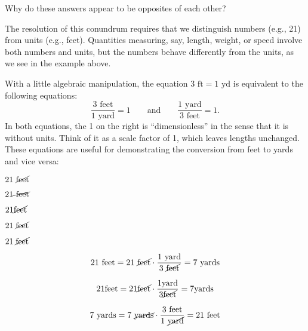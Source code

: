 \documentclass[nooutcomes]{ximera}
\begin{document}
Why do these answers appear to be opposites of each other?  

The resolution of this conundrum requires that we distinguish numbers (e.g., 21) from units (e.g., feet).  Quantities measuring, say, length, weight, or speed involve both numbers and units, but the numbers behave differently from the units, as we see in the example above.  

With a little algebraic manipulation, the equation $3\textrm{ ft} = 1 \textrm{ yd}$ is equivalent to the following equations:  
\[
\frac{3\textrm{ feet}}{1 \textrm{ yard}} = 1\qquad \textrm{and}\qquad \frac{1 \textrm{ yard}}{3\textrm{ feet}} = 1.
\]
In both equations, the 1 on the right is ``dimensionless'' in the sense that it is without units.  Think of it as a scale factor of 1, which leaves lengths unchanged.  These equations are useful for demonstrating the conversion from feet to yards and vice versa:  

%

$21\textrm{ \cancel{feet}}$

$21 \cancel{\textrm{ feet}}$

$21\cancel{\textrm{feet}}$

$21\;\cancel{\textrm{feet}}$

$21\;\cancel{\textrm{feet}}$



\[
21\ \textrm{feet} = 21\ \cancel{\textrm{feet}} \cdot \frac{{1\ \textrm{yard}}}{3\ \cancel{\textrm{feet}}} = 7\ \textrm{yards}
\]

\[
21 \textrm{feet} = 21 \cancel{\textrm{feet}} \cdot \frac{{1 \textrm{yard}}}{3 \cancel{\textrm{feet}}} = 7 \textrm{yards}
\]


\[
7\textrm{ yards} = 7\textrm{ \cancel{yards}} \cdot \frac{{3 \textrm{ feet}}}{1\textrm{ \cancel{yard}}} = 
21\textrm{ feet}
\]
\end{document}
